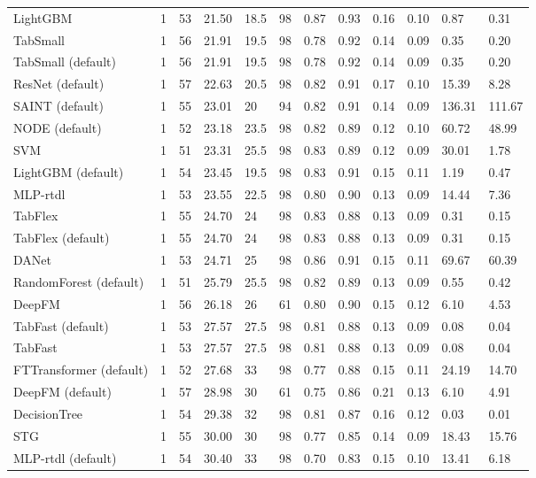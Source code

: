 \begin{tabular}{lllllrllllll}
LightGBM & 1 & 53 & 21.50 & 18.5 & 98 & 0.87 & 0.93 & 0.16 & 0.10 & 0.87 & 0.31 \\
TabSmall & 1 & 56 & 21.91 & 19.5 & 98 & 0.78 & 0.92 & 0.14 & 0.09 & 0.35 & 0.20 \\
TabSmall (default) & 1 & 56 & 21.91 & 19.5 & 98 & 0.78 & 0.92 & 0.14 & 0.09 & 0.35 & 0.20 \\
ResNet (default) & 1 & 57 & 22.63 & 20.5 & 98 & 0.82 & 0.91 & 0.17 & 0.10 & 15.39 & 8.28 \\
SAINT (default) & 1 & 55 & 23.01 & 20 & 94 & 0.82 & 0.91 & 0.14 & 0.09 & 136.31 & 111.67 \\
NODE (default) & 1 & 52 & 23.18 & 23.5 & 98 & 0.82 & 0.89 & 0.12 & 0.10 & 60.72 & 48.99 \\
SVM & 1 & 51 & 23.31 & 25.5 & 98 & 0.83 & 0.89 & 0.12 & 0.09 & 30.01 & 1.78 \\
LightGBM (default) & 1 & 54 & 23.45 & 19.5 & 98 & 0.83 & 0.91 & 0.15 & 0.11 & 1.19 & 0.47 \\
MLP-rtdl & 1 & 53 & 23.55 & 22.5 & 98 & 0.80 & 0.90 & 0.13 & 0.09 & 14.44 & 7.36 \\
TabFlex & 1 & 55 & 24.70 & 24 & 98 & 0.83 & 0.88 & 0.13 & 0.09 & 0.31 & 0.15 \\
TabFlex (default) & 1 & 55 & 24.70 & 24 & 98 & 0.83 & 0.88 & 0.13 & 0.09 & 0.31 & 0.15 \\
DANet & 1 & 53 & 24.71 & 25 & 98 & 0.86 & 0.91 & 0.15 & 0.11 & 69.67 & 60.39 \\
RandomForest (default) & 1 & 51 & 25.79 & 25.5 & 98 & 0.82 & 0.89 & 0.13 & 0.09 & 0.55 & 0.42 \\
DeepFM & 1 & 56 & 26.18 & 26 & 61 & 0.80 & 0.90 & 0.15 & 0.12 & 6.10 & 4.53 \\
TabFast (default) & 1 & 53 & 27.57 & 27.5 & 98 & 0.81 & 0.88 & 0.13 & 0.09 & 0.08 & 0.04 \\
TabFast & 1 & 53 & 27.57 & 27.5 & 98 & 0.81 & 0.88 & 0.13 & 0.09 & 0.08 & 0.04 \\
FTTransformer (default) & 1 & 52 & 27.68 & 33 & 98 & 0.77 & 0.88 & 0.15 & 0.11 & 24.19 & 14.70 \\
DeepFM (default) & 1 & 57 & 28.98 & 30 & 61 & 0.75 & 0.86 & 0.21 & 0.13 & 6.10 & 4.91 \\
DecisionTree & 1 & 54 & 29.38 & 32 & 98 & 0.81 & 0.87 & 0.16 & 0.12 & 0.03 & 0.01 \\
STG & 1 & 55 & 30.00 & 30 & 98 & 0.77 & 0.85 & 0.14 & 0.09 & 18.43 & 15.76 \\
MLP-rtdl (default) & 1 & 54 & 30.40 & 33 & 98 & 0.70 & 0.83 & 0.15 & 0.10 & 13.41 & 6.18 \\

\end{tabular}
